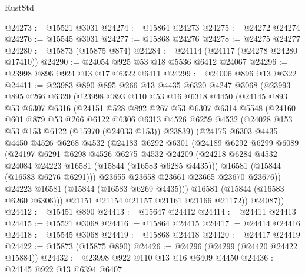 \begin{lexlean}{RustStd}
\begin{coremodule}
@24273 := @15521 @3031
@24274 := @15864 @24273
@24275 := @24272 @24274
@24276 := @15545 @3031
@24277 := @15868 @24276
@24278 := @24275 @24277
@24280 := @15873 (@15875 @874)
@24284 := @24114 (@24117 (@24278 @24280 @17410))
@24290 := @24054 @925 @53 @18 @5536 @6412 @24067
@24296 := @23998 @896 @924 @13 @17 @6322 @6411
@24299 := @24006 @896 @13 @6322
@24411 := @23983
    @890
    @895
    @266
    @13
    @4435
    @6320
    @4247
    @3068
    (@23993
      @895
      @266
      @6320
      (@23998
        @893
        @110
        @53
        @16
        @6318
        @4450
        (@24145
          @893
          @53
          @6307
          @6316
          (@24151
            @528
            @892
            @267
            @53
            @6307
            @6314
            @5548
            (@24160
              @601
              @879
              @53
              @266
              @6122
              @6306
              @6313
              @4526
              @6259
              @4532
              (@24028 @153 @53 @153 @6122 (@15970 (@24033 @153)) @23839)
              (@24175
                @6303
                @4435
                @4450
                @4526
                @6268
                @4532
                (@24183
                  @6292
                  @6301
                  (@24189
                    @6292
                    @6299
                    @6089
                    (@24197
                      @6291
                      @6298
                      @4526
                      @6275
                      @4532
                      @24209
                      (@24218 @6284 @4532 @24084 @24223 @16581 (@15844 (@16583 @6285 @4435)))
                      @16581
                      (@15844 (@16583 @6276 @6291)))
                    @23655
                    @23658
                    @23661
                    @23665
                    @23670
                    @23676))
                @24223
                @16581
                (@15844 (@16583 @6269 @4435)))
              @16581
              (@15844 (@16583 @6260 @6306)))
            @21151
            @21154
            @21157
            @21161
            @21166
            @21172))
        @24087))
@24412 := @15451 @890
@24413 := @15647 @24412
@24414 := @24411 @24413
@24415 := @15521 @3068
@24416 := @15864 @24415
@24417 := @24414 @24416
@24418 := @15545 @3068
@24419 := @15868 @24418
@24420 := @24417 @24419
@24422 := @15873 (@15875 @890)
@24426 := @24296 (@24299 (@24420 @24422 @15884))
@24432 := @23998 @922 @110 @13 @16 @6409 @4450
@24436 := @24145 @922 @13 @6394 @6407

\end{coremodule}
\end{lexlean}
